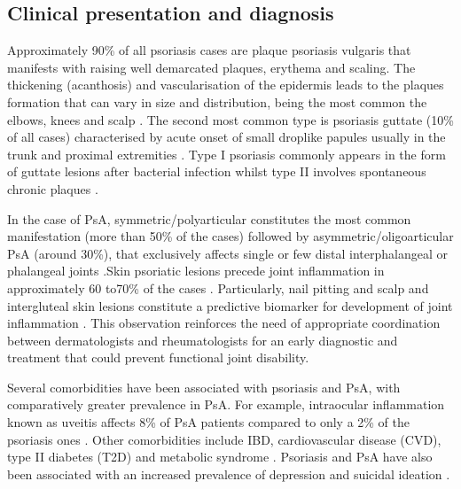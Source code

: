 \subsection{Clinical presentation and diagnosis}
%
Approximately 90\% of all psoriasis cases are plaque psoriasis vulgaris that manifests with raising well demarcated plaques, erythema and scaling. The thickening (acanthosis) and vascularisation of the epidermis leads to the plaques formation \parencite{Perera2012} that can vary in size and distribution, being the most common the elbows, knees and scalp \parencite{Griffiths2007}. The second most common type is psoriasis guttate (10\% of all cases) characterised by acute onset of small droplike papules usually in the trunk and proximal extremities \parencite{Vence2015}. Type I psoriasis commonly appears in the form of guttate lesions after bacterial infection whilst type II involves spontaneous chronic plaques \parencite{Perera2012}. %

In the case of PsA, symmetric/polyarticular constitutes the most common manifestation (more than 50\% of the cases) followed by asymmetric/oligoarticular PsA (around 30\%), that exclusively affects single or few distal interphalangeal or phalangeal joints \parencite{Reich2009, McGonagle2011}.Skin psoriatic lesions precede joint inflammation in approximately 60 to70\% of the cases \parencite{Gladman2005, McGonagle2011}. Particularly, nail pitting and scalp and intergluteal skin lesions constitute a predictive biomarker for development of joint inflammation \parencite{Moll1976,Griffiths2007,McGonagle,2011}. This observation reinforces the need of appropriate coordination between dermatologists and rheumatologists for an early diagnostic and treatment that could prevent functional joint disability.

Several comorbidities have been associated with psoriasis and PsA, with comparatively greater prevalence in PsA. For example, intraocular inflammation known as uveitis affects 8\% of PsA patients compared to only a 2\% of the psoriasis ones \parencite{Husted2011, Oliveira2015}. Other comorbidities include IBD, cardiovascular disease (CVD), type II diabetes (T2D) and metabolic syndrome \parencite{ Gelfand2006, Saphiro2007,Cohrn20017}. Psoriasis and PsA have also been associated with an increased prevalence of depression and suicidal ideation \parencite{Sampogna2012}.


